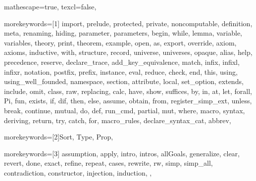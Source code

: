 
 {

mathescape=true,
texcl=false,

morekeywords=[1]{
import, prelude, protected, private, noncomputable, definition, meta, renaming,
hiding, parameter, parameters, begin, while,
lemma, variable, variables, theory,
print, theorem, example,
open, as, export, override, axiom, axioms, inductive, with,
structure, record, universe, universes, opaque,
alias, help, precedence, reserve, declare_trace, add_key_equivalence,
match, infix, infixl, infixr, notation, postfix, prefix, instance,
eval, reduce, check, end, this,
using, using_well_founded, namespace, section,
attribute, local, set_option, extends, include, omit, class,
raw, replacing,
calc, have, show, suffices, by, in, at, let, forall, Pi, fun,
exists, if, dif, then, else, assume, obtain, from, register_simp_ext, unless, break, continue,
mutual, do, def, run_cmd,
partial, mut, where, macro, syntax, deriving,
return, try, catch, for, macro_rules, declare_syntax_cat, abbrev},

morekeywords=[2]{Sort, Type, Prop},

morekeywords=[3]{
assumption,
apply, intro, intros, allGoals,
generalize, clear, revert, done, exact,
refine, repeat, cases, rewrite, rw,
simp, simp_all, contradiction,
constructor, injection,
induction,
},


}
